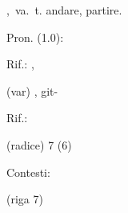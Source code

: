 ,\ va.\ t.
andare, partire.
\begin{subvocedue}
\item[Pron. (1.0):] 
\item[Rif.:] , 
\end{subvocedue}
\begin{subvocedue}
\item[(var)] , {\sf git-}\begin{subvocedue}
\item[Rif.:] 
\end{subvocedue}
\item[(radice)]   7 (6)
\end{subvocedue}
Contesti:
\begin{subvocedue}
\item[(riga 7)] 
\end{subvocedue}

